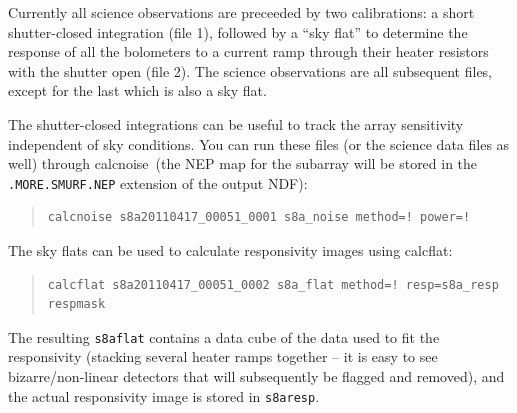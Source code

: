 \documentclass[twoside,11pt]{article}
\newcommand{\xref}[3]{#1}
\renewcommand{\_}{\texttt{\symbol{95}}}
\newenvironment{myquote}{\begin{quote}\begin{small}}{\end{small}\end{quote}}
\newcommand{\task}[1]{\textsf{#1}}
\newcommand{\calcflat}{\xref{\task{calcflat}}{sun258}{CALCFLAT}}
\newcommand{\calcnoise}{\xref{\task{calcnoise}}{sun258}{CALCNOISE}}
\begin{document}
Currently all science observations are preceeded by two calibrations:
a short shutter-closed integration (file 1), followed by a ``sky
flat'' to determine the response of all the bolometers to a current
ramp through their heater resistors with the shutter open (file 2).
The science observations are all subsequent files, except for the last
which is also a sky flat.

The shutter-closed integrations can be useful to track the array
sensitivity independent of sky conditions. You can run these files (or
the science data files as well) through \calcnoise\ (the NEP map for
the subarray will be stored in the \texttt{.MORE.SMURF.NEP} extension
of the output NDF):

\begin{myquote}
\begin{verbatim}
calcnoise s8a20110417_00051_0001 s8a_noise method=! power=!
\end{verbatim}
\end{myquote}

The sky flats can be used to calculate responsivity images using
\calcflat:

\begin{myquote}
\begin{verbatim}
calcflat s8a20110417_00051_0002 s8a_flat method=! resp=s8a_resp respmask
\end{verbatim}
\end{myquote}

The resulting \texttt{s8a\_flat} contains a data cube of the data used
to fit the responsivity (stacking several heater ramps together -- it
is easy to see bizarre/non-linear detectors that will subsequently be
flagged and removed), and the actual responsivity image is stored in
\texttt{s8a\_resp}.
\end{document}
